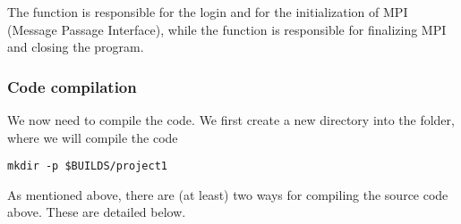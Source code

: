 The function  is responsible for the login 
and for the initialization of MPI (Message Passage Interface), 
while the function  is responsible for
finalizing MPI and closing the program.



\subsubsection*{Code compilation}
We now need to compile the code. We first create a new directory
into the  folder, where we will compile the code
%
\begin{lstlisting}[style=BashStyle]
mkdir -p $BUILDS/project1
\end{lstlisting}
%
As mentioned above, there are (at least) two ways for compiling 
the source code above. These are detailed below.
%
